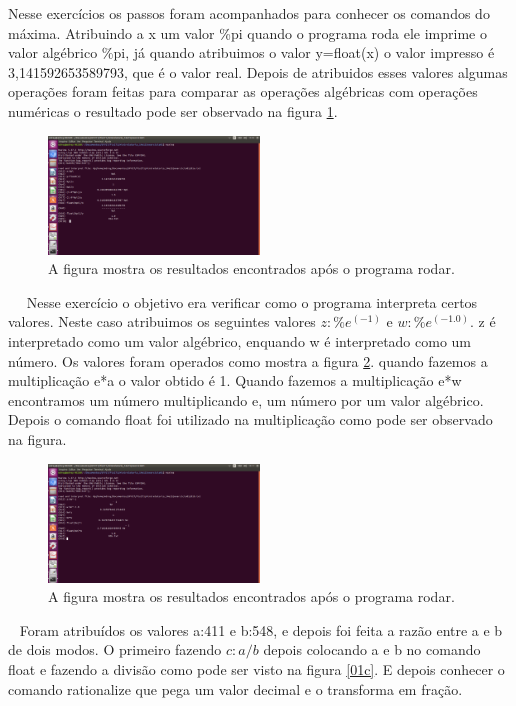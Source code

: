 \documentclass[a4wide]{report}
\begin{document}

\vspace{0.5cm}

 Nesse exercícios os passos foram acompanhados para conhecer os comandos do máxima. Atribuindo a x um valor \%pi quando o programa roda ele imprime o valor algébrico \%pi, já quando atribuimos o valor y=float(x) o valor impresso é 3,141592653589793, que é o valor real. Depois de atribuidos esses valores algumas operações foram feitas para comparar as operações algébricas com operações numéricas o resultado pode ser observado na figura \ref{01a}.

\begin{figure}[h]
\centering
\includegraphics[width=0.50\textwidth]{01a.pdf}
\caption{A figura mostra os resultados encontrados após o programa rodar.}
\label{01a}
\end{figure}
\
\
 Nesse exercício o objetivo era verificar como o programa interpreta certos valores. Neste caso atribuimos os seguintes valores $z:\%e^(-1)$ e $w:\%e^(-1.0)$. z é interpretado como um valor algébrico, enquando w é interpretado como um número. Os valores foram operados como mostra a figura \ref{01b}. quando fazemos a multiplicação e*a o valor obtido é 1. Quando fazemos a multiplicação e*w encontramos um número multiplicando e, um número por um valor algébrico. Depois o comando float foi utilizado na multiplicação como pode ser observado na figura.

\begin{figure}[h]
\centering
\includegraphics[width=0.50\textwidth]{01b.pdf}
\caption{A figura mostra os resultados encontrados após o programa rodar.}
\label{01b}
\end{figure}
\
 Foram atribuídos os valores a:411 e b:548, e depois foi feita a razão entre a e b de dois modos. O primeiro fazendo $c:a/b$ depois colocando a e b no comando float e fazendo a divisão como pode ser visto na figura \ref{01c}. E depois conhecer o comando rationalize que pega um valor decimal e o transforma em fração.
\end{document}
